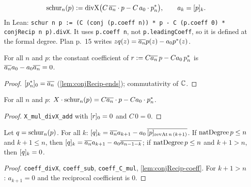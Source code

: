 \begin{definition}\label{def:schur}
\[ \Sch_n(p):=\divX\big(C\,\cj{a_n}\cdot p-C\,a_0\cdot\crec{n}{p}\big),\qquad a_k=\coeff pk. \]
In Lean: \texttt{schur n p := (C (conj (p.coeff n)) * p - C (p.coeff 0) * conjRecip n p).divX}.
It uses \texttt{p.coeff n}, not \texttt{p.leadingCoeff}, so it is defined at
the formal degree. Plan p.~15 writes $zq(z)=\cj{a_n}p(z)-a_0p^*(z)$.
\end{definition}

\begin{lemma}\label{lem:schur-constant-cancel}
For all $n$ and $p$: the constant coefficient of
$r:=C\cj{a_n}\,p-C a_0\,\crec np$ is $\cj{a_n}a_0-a_0\cj{a_n}=0$.
\end{lemma}
\begin{proof}
$\coeff{\crec np}0=\cj{a_n}$ (\ref{lem:conjRecip-ends}); commutativity of $\C$.
\end{proof}

\begin{lemma}\label{lem:schur-X-mul}
For all $n$ and $p$: $X\cdot\Sch_n(p)=C\cj{a_n}\cdot p-C a_0\cdot\crec np$.
\end{lemma}
\begin{proof}
\texttt{X\_mul\_divX\_add} with $\coeff r0=0$ and $C\,0=0$.
\end{proof}

\begin{lemma}[coefficients of $q$]\label{lem:schur-coeff}
Let $q=\Sch_n(p)$. For all $k$:
$\coeff qk=\cj{a_n}a_{k+1}-a_0\,\cj{\coeff p{\mathrm{revAt}\,n\,(k+1)}}$.
If $\natdeg\,p\le n$ and $k+1\le n$, then
$\coeff qk=\cj{a_n}a_{k+1}-a_0\cj{a_{n-1-k}}$; if $\natdeg\,p\le n$ and
$k+1>n$, then $\coeff qk=0$.
\end{lemma}
\begin{proof}
\texttt{coeff\_divX}, \texttt{coeff\_sub}, \texttt{coeff\_C\_mul},
\ref{lem:conjRecip-coeff}. For $k+1>n$: $a_{k+1}=0$ and the reciprocal
coefficient is $0$.
\end{proof}

